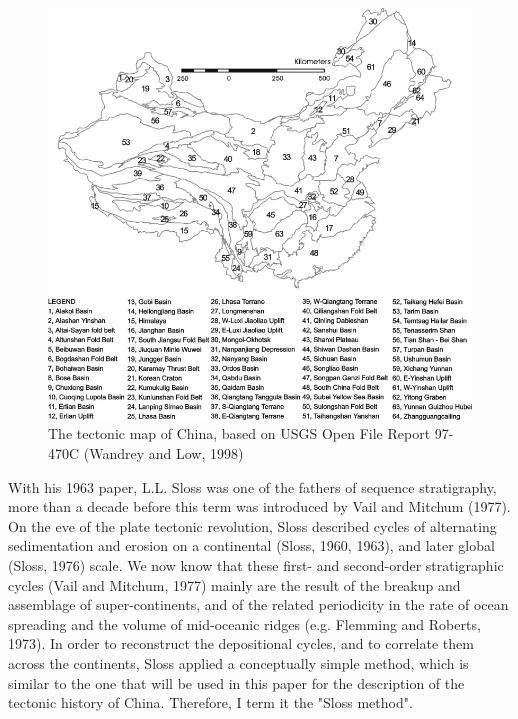 \documentclass{article}
\begin{document}
  \begin{figure}[htbp]
   \centering \includegraphics[width=1\textwidth]{chinazones.jpg}
   \caption{The tectonic map of China, based on USGS Open File Report 97-470C 
   (Wandrey and Low, 1998)}
   \label{fig:chinazones}
 \end{figure}

 With his  1963 paper, L.L. Sloss  was one of the  fathers of sequence
 stratigraphy, more than  a decade before this term  was introduced by
 Vail and Mitchum (1977). On the eve of the plate tectonic revolution,
 Sloss described cycles of  alternating sedimentation and erosion on a
 continental  (Sloss,  1960, 1963),  and  later  global (Sloss,  1976)
 scale. We  now know that these first-  and second-order stratigraphic
 cycles (Vail and Mitchum, 1977)  mainly are the result of the breakup
 and assemblage of super-continents, and of the related periodicity in
 the  rate of  ocean spreading  and the  volume of  mid-oceanic ridges
 (e.g.   Flemming and  Roberts,  1973). In  order  to reconstruct  the
 depositional  cycles, and  to correlate  them across  the continents,
 Sloss applied a  conceptually simple method, which is  similar to the
 one  that will  be used  in  this paper  for the  description of  the
 tectonic history of China.  Therefore,  I term it the "Sloss method".
 \\
\end{document}
